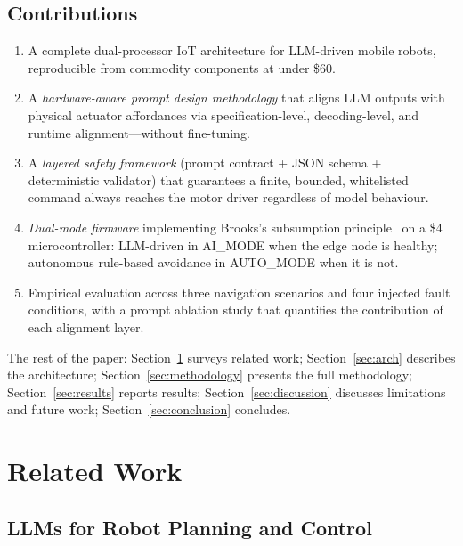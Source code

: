 \documentclass[conference]{IEEEtran}
\begin{document}
\subsection*{Contributions}
\begin{enumerate}[leftmargin=*, nosep]
  \item A complete dual-processor IoT architecture for LLM-driven mobile
        robots, reproducible from commodity components at under \$60.
  \item A \emph{hardware-aware prompt design methodology} that aligns LLM
        outputs with physical actuator affordances via specification-level,
        decoding-level, and runtime alignment---without fine-tuning.
  \item A \emph{layered safety framework} (prompt contract + JSON schema +
        deterministic validator) that guarantees a finite, bounded, whitelisted
        command always reaches the motor driver regardless of model behaviour.
  \item \emph{Dual-mode firmware} implementing Brooks's subsumption
        principle~\cite{brooks1986robust} on a \$4 microcontroller:
        LLM-driven in AI\_MODE when the edge node is healthy;
        autonomous rule-based avoidance in AUTO\_MODE when it is not.
  \item Empirical evaluation across three navigation scenarios and four
        injected fault conditions, with a prompt ablation study that
        quantifies the contribution of each alignment layer.
\end{enumerate}

The rest of the paper: Section~\ref{sec:related} surveys related work;
Section~\ref{sec:arch} describes the architecture;
Section~\ref{sec:methodology} presents the full methodology;
Section~\ref{sec:results} reports results;
Section~\ref{sec:discussion} discusses limitations and future work;
Section~\ref{sec:conclusion} concludes.

\section{Related Work}
\label{sec:related}

\subsection{LLMs for Robot Planning and Control}
\end{document}
